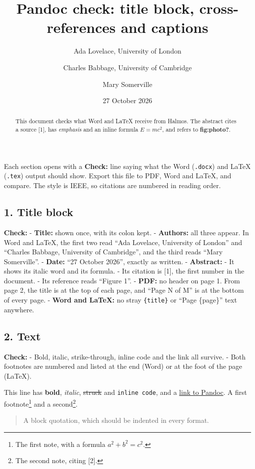 \documentclass[
]{article}
\title{Pandoc check: title block, cross-references and captions}
\author{Ada Lovelace, University of London \and Charles Babbage,
University of Cambridge \and Mary Somerville}
\date{27 October 2026}
\begin{document}
\maketitle
\begin{abstract}
This document checks what Word and LaTeX receive from Halmos. The
abstract cites a source {[}1{]}, has \emph{emphasis} and an inline
formula \(E = mc^2\), and refers to \textbf{fig:photo?}.
\end{abstract}

Each section opens with a \textbf{Check:} line saying what the Word
(\texttt{.docx}) and LaTeX (\texttt{.tex}) output should show. Export
this file to PDF, Word and LaTeX, and compare. The style is IEEE, so
citations are numbered in reading order.

\subsection{1. Title block}\label{title-block}

\textbf{Check:} - \textbf{Title:} shown once, with its colon kept. -
\textbf{Authors:} all three appear. In Word and LaTeX, the first two
read ``Ada Lovelace, University of London'' and ``Charles Babbage,
University of Cambridge'', and the third reads ``Mary Somerville''. -
\textbf{Date:} ``27 October 2026'', exactly as written. -
\textbf{Abstract:} - It shows its italic word and its formula. - Its
citation is {[}1{]}, the first number in the document. - Its reference
reads ``Figure 1''. - \textbf{PDF:} no header on page 1. From page 2,
the title is at the top of each page, and ``Page N of M'' is at the
bottom of every page. - \textbf{Word and LaTeX:} no stray
\texttt{\{title\}} or ``Page \{page\}'' text anywhere.

\subsection{2. Text}\label{text}

\textbf{Check:} - Bold, italic, strike-through, inline code and the link
all survive. - Both footnotes are numbered and listed at the end (Word)
or at the foot of the page (LaTeX).

This line has \textbf{bold}, \emph{italic}, \st{struck} and
\texttt{inline\ code}, and a \href{https://pandoc.org}{link to Pandoc}.
A first footnote\footnote{The first note, with a formula
  \(a^2 + b^2 = c^2\).} and a second\footnote{The second note, citing
  {[}2{]}.}.

\begin{quote}
A block quotation, which should be indented in every format.
\end{quote}
\end{document}
